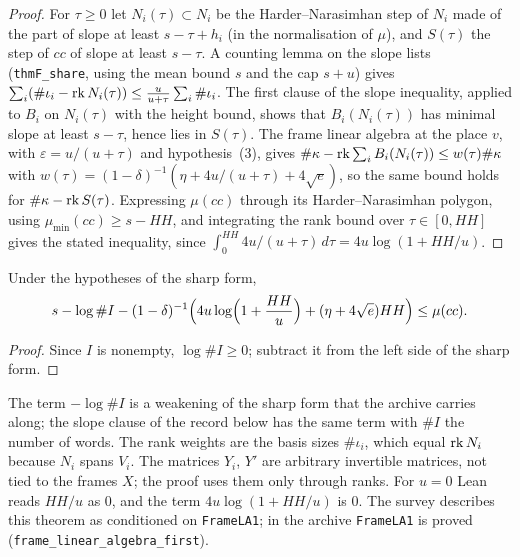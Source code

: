 \begin{proof}
For $\tau\ge0$ let $N_i(\tau)\subset N_i$ be the Harder--Narasimhan step of $N_i$ made of
the part of slope at least $s-\tau+h_i$ (in the normalisation of $\mu$), and $S(\tau)$
the step of $cc$ of slope at least $s-\tau$. A counting lemma on the slope lists
(\texttt{thmF\_share}, using the mean bound $s$ and the cap $s+u$) gives
$\sum_i(\#\iota_i-\operatorname{rk} N_i(\tau))\le\frac u{u+\tau}\sum_i\#\iota_i$. The first clause of
the slope inequality, applied to $B_i$ on $N_i(\tau)$ with the height bound, shows that
$B_i(N_i(\tau))$ has minimal slope at least $s-\tau$, hence lies in $S(\tau)$. The frame
linear algebra at the place $v$, with $\varepsilon=u/(u+\tau)$ and hypothesis~(3), gives
$\#\kappa-\operatorname{rk}\sum_iB_i(N_i(\tau))\le w(\tau)\#\kappa$ with
$w(\tau)=(1-\delta)^{-1}(\eta+4u/(u+\tau)+4\sqrt e)$, so the same bound holds for
$\#\kappa-\operatorname{rk} S(\tau)$. Expressing $\mu(cc)$ through its Harder--Narasimhan polygon,
using $\mu_{\min}(cc)\ge s-HH$, and integrating the rank bound over $\tau\in[0,HH]$ gives
the stated inequality, since $\int_0^{HH}4u/(u+\tau)\,d\tau=4u\log(1+HH/u)$.
\end{proof}

\begin{theorem}\label{geoa:theoremF}
Under the hypotheses of the sharp form,
\[
s-\log\#I-(1-\delta)^{-1}\Bigl(4u\log\Bigl(1+\frac{HH}u\Bigr)+(\eta+4\sqrt e)HH\Bigr)\le\mu(cc).
\]
\end{theorem}
\begin{proof}
Since $I$ is nonempty, $\log\#I\ge0$; subtract it from the left side of the sharp form.
\end{proof}

\begin{remark}\label{geoa:rem-theoremF}
The term $-\log\#I$ is a weakening of the sharp form that the archive carries along; the
slope clause of the record below has the same term with $\#I$ the number of words. The
rank weights are the basis sizes $\#\iota_i$, which equal $\operatorname{rk} N_i$ because $N_i$ spans
$V_i$. The matrices $Y_i$, $Y'$ are arbitrary invertible matrices, not tied to the frames
$X$; the proof uses them only through ranks. For $u=0$ Lean reads $HH/u$ as $0$, and the
term $4u\log(1+HH/u)$ is $0$. The survey describes this theorem as conditioned on
\texttt{FrameLA1}; in the archive \texttt{FrameLA1} is proved
(\texttt{frame\_linear\_algebra\_first}).
\end{remark}

